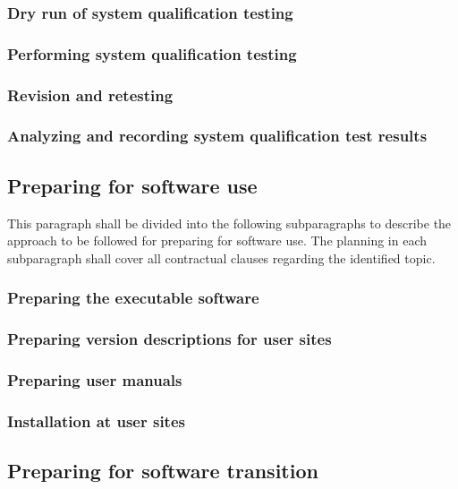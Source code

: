 \subsubsection{Dry run of system qualification testing}

\subsubsection{Performing system qualification testing}

\subsubsection{Revision and retesting}

\subsubsection{Analyzing and recording system qualification test
results}

\subsection{Preparing for software use}

This paragraph shall be divided into the following subparagraphs to
describe the approach to be followed for preparing for software use. The
planning in each subparagraph shall cover all contractual clauses
regarding the identified topic.

\subsubsection{Preparing the executable software}

\subsubsection{Preparing version descriptions for user sites}

\subsubsection{Preparing user manuals}

\subsubsection{Installation at user sites}

\subsection{Preparing for software transition}

